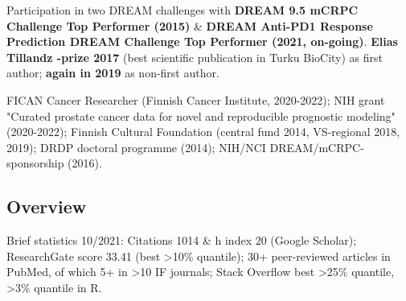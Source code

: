 \documentclass[letterpaper]{twentysecondcv} %
\begin{document}
\vspace*{-0.2cm}
Participation in two DREAM challenges with \textbf{DREAM 9.5 mCRPC Challenge Top Performer (2015)} \& \textbf{DREAM Anti-PD1 Response Prediction DREAM Challenge Top Performer (2021, on-going)}. \textbf{Elias Tillandz -prize 2017} (best scientific publication in Turku BioCity) as first author; \textbf{again in 2019} as non-first author.



\vspace*{-0.1cm}
FICAN Cancer Researcher (Finnish Cancer Institute, 2020-2022); NIH grant "Curated prostate cancer data for novel and reproducible prognostic modeling" (2020-2022); Finnish Cultural Foundation (central fund 2014, VS-regional 2018, 2019); DRDP doctoral programme (2014); NIH/NCI DREAM/mCRPC-sponsorship (2016).

\subsection{Overview}

\vspace*{-0.2cm}
Brief statistics 10/2021: Citations 1014 \& h index 20 (Google Scholar); ResearchGate score 33.41 (best >10\% quantile); 30+ peer-reviewed articles in PubMed, of which 5+ in >10 IF journals; Stack Overflow best >25\% quantile, >3\% quantile in R.

\end{document}
